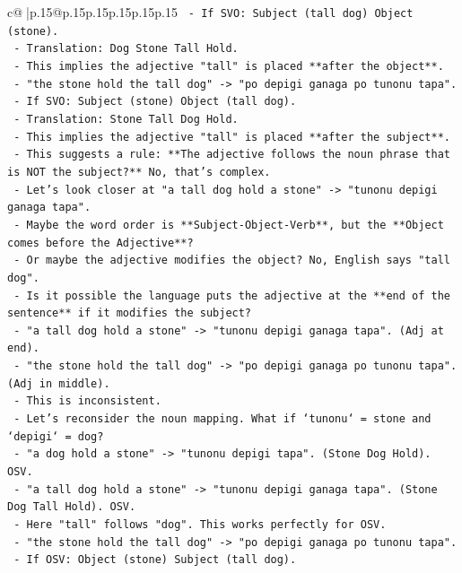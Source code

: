 \documentclass{article}
\begin{document}
{\begin{supertabular}{c@{$\;$}|p{.15\linewidth}@{}p{.15\linewidth}p{.15\linewidth}p{.15\linewidth}p{.15\linewidth}p{.15\linewidth}}
{{{\texttt{     {-} If SVO: Subject (tall dog) Object (stone).} \\
\texttt{     {-} Translation: Dog Stone Tall Hold.} \\
\texttt{     {-} This implies the adjective "tall" is placed **after the object**.} \\
\texttt{   {-} "the stone hold the tall dog" {-}> "po depigi ganaga po tunonu tapa".} \\
\texttt{     {-} If SVO: Subject (stone) Object (tall dog).} \\
\texttt{     {-} Translation: Stone Tall Dog Hold.} \\
\texttt{     {-} This implies the adjective "tall" is placed **after the subject**.} \\
\texttt{   {-} This suggests a rule: **The adjective follows the noun phrase that is NOT the subject?** No, that's complex.} \\
\texttt{   {-} Let's look closer at "a tall dog hold a stone" {-}> "tunonu depigi ganaga tapa".} \\
\texttt{     {-} Maybe the word order is **Subject{-}Object{-}Verb**, but the **Object comes before the Adjective**?} \\
\texttt{     {-} Or maybe the adjective modifies the object? No, English says "tall dog".} \\
\texttt{     {-} Is it possible the language puts the adjective at the **end of the sentence** if it modifies the subject?} \\
\texttt{     {-} "a tall dog hold a stone" {-}> "tunonu depigi ganaga tapa". (Adj at end).} \\
\texttt{     {-} "the stone hold the tall dog" {-}> "po depigi ganaga po tunonu tapa". (Adj in middle).} \\
\texttt{     {-} This is inconsistent.} \\
\texttt{   {-} Let's reconsider the noun mapping. What if `tunonu` = stone and `depigi` = dog?} \\
\texttt{     {-} "a dog hold a stone" {-}> "tunonu depigi tapa". (Stone Dog Hold). OSV.} \\
\texttt{     {-} "a tall dog hold a stone" {-}> "tunonu depigi ganaga tapa". (Stone Dog Tall Hold). OSV.} \\
\texttt{       {-} Here "tall" follows "dog". This works perfectly for OSV.} \\
\texttt{     {-} "the stone hold the tall dog" {-}> "po depigi ganaga po tunonu tapa".} \\
\texttt{       {-} If OSV: Object (stone) Subject (tall dog).} \\
}}}
\end{supertabular}}
\end{document}
